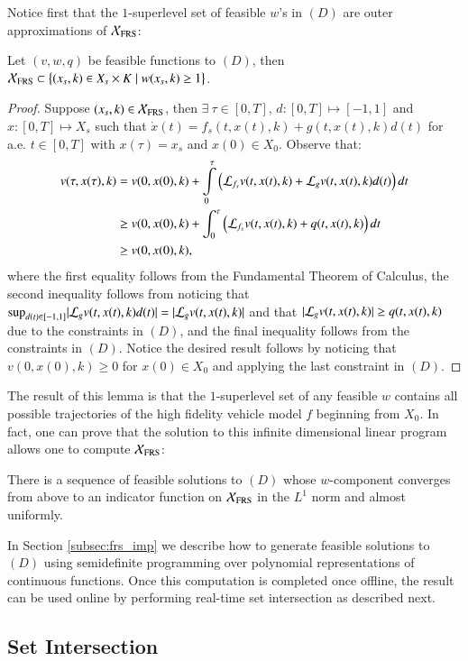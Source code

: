 Notice first that the $1$-superlevel set of feasible $w$'s in $(D)$ are outer approximations of $\mathcal{X}_\text{FRS}$:
\begin{lem}\label{lem:feasible_w}
Let $(v,w,q)$ be feasible functions to $(D)$, then $\mathcal{X}_\text{FRS} \subset \big\{(x_s,k) \in X_s \times K \mid w(x_s,k) \geq 1 \big\}$.
\end{lem}
\begin{proof}
Suppose $(x_s,k) \in \mathcal{X}_\text{FRS}$, then $\exists~\tau \in [0,T]$, $d:[0,T] \mapsto [-1,1]$ and $x:[0,T] \mapsto X_s$ such that $\dot{x}(t) = f_s(t,x(t),k) + g(t,x(t),k)d(t)$ for a.e. $t\in [0,T]$ with $x(\tau) = x_s$ and $x(0) \in X_0$.
Observe that:
\begin{align*}
v(\tau,x(\tau),k) &= v(0,x(0),k) + \int\limits_0^{\tau} \left(\mathcal{L}_{f_s} v(t,x(t),k) + \mathcal{L}_g v(t,x(t),k) d(t) \right) dt \\
&\geq v(0,x(0),k) + \int_0^{\tau} \left( \mathcal{L}_{f_s} v(t,x(t),k) + q(t,x(t),k) \right) dt \\
&\geq v(0,x(0),k),
\end{align*}
where the first equality follows from the Fundamental Theorem of Calculus, the second inequality follows from noticing that $\text{sup}_{d(t) \in [-1,1]} |\mathcal{L}_g v(t,x(t),k) d(t) | = |\mathcal{L}_g v(t,x(t),k) |$ and that $  |\mathcal{L}_g v(t,x(t),k) | \geq q(t,x(t),k) $ due to the constraints in $(D)$, and the final inequality follows from the constraints in $(D)$. 
Notice the desired result follows by noticing that $v(0,x(0),k) \geq 0$ for $x(0) \in X_0$ and applying the last constraint in $(D)$.
\end{proof}

The result of this lemma is that the $1$-superlevel set of any feasible $w$ contains all possible trajectories of the high fidelity vehicle model $f$ beginning from $X_0$.
In fact, one can prove that the solution to this infinite dimensional linear program allows one to compute $\mathcal{X}_\text{FRS}$:
\begin{thm}{\cite[Theorem 3.5]{majumdar2014convex}}
There is a sequence of feasible solutions to $(D)$ whose $w$-component converges from above to an indicator function on $\mathcal{X}_\text{FRS}$ in the $L^1$ norm and almost uniformly.
\end{thm}
In Section \ref{subsec:frs_imp} we describe how to generate feasible solutions to $(D)$ using semidefinite programming over polynomial representations of continuous functions.
Once this computation is completed once offline, the result can be used online by performing real-time set intersection as described next.

\subsection{Set Intersection}
\label{subsec:set_intersection}

